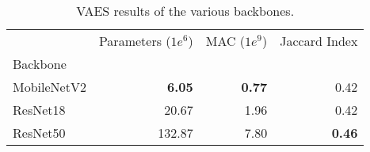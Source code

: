 \begin{table}[ht]
\centering
\caption{VAES results of the various backbones.}
\label{tab:vaes-backbones-results}
\begin{tabular}{lrrr}
\toprule
 & Parameters ($1e^6$) & MAC ($1e^9$) & Jaccard Index \\
Backbone &  &  &  \\
\midrule
MobileNetV2 & \textbf{6.05} & \textbf{0.77} & 0.42 \\
ResNet18 & 20.67 & 1.96 & 0.42 \\
ResNet50 & 132.87 & 7.80 & \textbf{0.46} \\
\bottomrule
\end{tabular}
\end{table}
